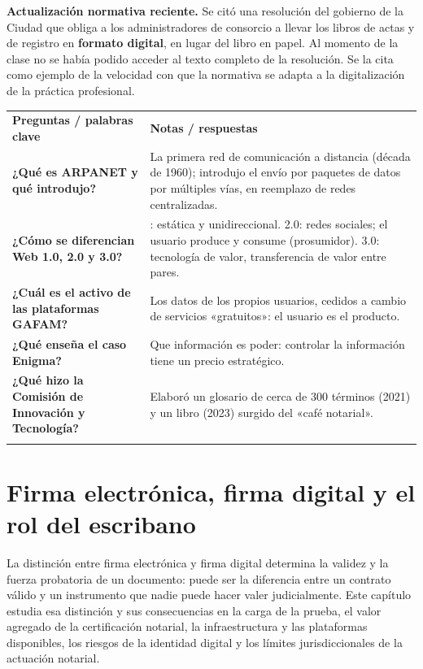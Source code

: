 \documentclass[12pt,oneside]{book}
\newcommand{\cq}[1]{\textbf{#1}}
\newcommand{\cornell}[3]{%
  \par\medskip\noindent\begingroup
  \renewcommand{\arraystretch}{1.25}%
  \begin{tabularx}{\textwidth}{|>{\raggedright\arraybackslash}p{0.27\textwidth}|>{\raggedright\arraybackslash}X|}
    \hline
    \multicolumn{2}{|>{\centering\arraybackslash}X|}{\cellcolor{azulacad!12}\textbf{Cuadro Cornell --- #1}}\\ \hline
    \cellcolor{gray!10}\textbf{Preguntas / palabras clave} & \cellcolor{gray!10}\textbf{Notas / respuestas} \\ \hline
    #2
    \multicolumn{2}{|>{\raggedright\arraybackslash}X|}{\cellcolor{azulacad!6}\textbf{Resumen.} #3}\\ \hline
  \end{tabularx}%
  \endgroup\par\medskip}
\begin{document}
\begin{important}
\textbf{Actualización normativa reciente.} Se citó una resolución del gobierno de la Ciudad que obliga a los administradores de consorcio a llevar los libros de actas y de registro en \textbf{formato digital}, en lugar del libro en papel. Al momento de la clase no se había podido acceder al texto completo de la resolución. Se la cita como ejemplo de la velocidad con que la normativa se adapta a la digitalización de la práctica profesional.
\end{important}

\cornell{Internet, datos y plataformas}{
\cq{¿Qué es ARPANET y qué introdujo?} & La primera red de comunicación a distancia (década de 1960); introdujo el envío por paquetes de datos por múltiples vías, en reemplazo de redes centralizadas. \\ \hline
\cq{¿Cómo se diferencian Web 1.0, 2.0 y 3.0?} & 1.0: estática y unidireccional. 2.0: redes sociales; el usuario produce y consume (prosumidor). 3.0: tecnología de valor, transferencia de valor entre pares. \\ \hline
\cq{¿Cuál es el activo de las plataformas GAFAM?} & Los datos de los propios usuarios, cedidos a cambio de servicios «gratuitos»: el usuario es el producto. \\ \hline
\cq{¿Qué enseña el caso Enigma?} & Que información es poder: controlar la información tiene un precio estratégico. \\ \hline
\cq{¿Qué hizo la Comisión de Innovación y Tecnología?} & Elaboró un glosario de cerca de 300 términos (2021) y un libro (2023) surgido del «café notarial». \\ \hline
}{La evolución de internet pasa del usuario espectador al prosumidor, cuyos datos son el activo de las plataformas; esa lógica de control de la información prepara el terreno de la Web 3.0. El notariado respondió con formación y producción propia.}

\chapter{Firma electrónica, firma digital y el rol del escribano}
\label{cap:firma}

La distinción entre firma electrónica y firma digital determina la validez y la fuerza probatoria de un documento: puede ser la diferencia entre un contrato válido y un instrumento que nadie puede hacer valer judicialmente. Este capítulo estudia esa distinción y sus consecuencias en la carga de la prueba, el valor agregado de la certificación notarial, la infraestructura y las plataformas disponibles, los riesgos de la identidad digital y los límites jurisdiccionales de la actuación notarial.
\end{document}
